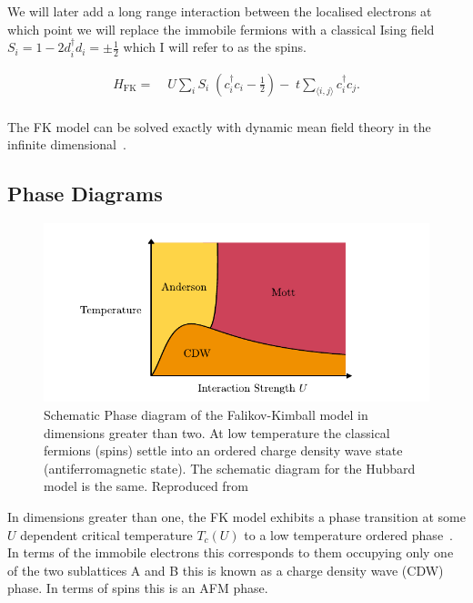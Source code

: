 We will later add a long range interaction between the localised electrons at which point we will replace the immobile fermions with a classical Ising field \(S_i = 1 - 2d^\dagger_id_i = \pm\tfrac{1}{2}\) which I will refer to as the spins.

\[\begin{aligned}
H_{\mathrm{FK}} = & \;U \sum_{i} S_i\;(c^\dagger_{i}c_{i} - \tfrac{1}{2}) -\;t \sum_{\langle i,j\rangle} c^\dagger_{i}c_{j}.\\ 
\end{aligned}\]

The FK model can be solved exactly with dynamic mean field theory in the infinite dimensional~\autocite{antipovCriticalExponentsStrongly2014,ribicNonlocalCorrelationsSpectral2016,freericksExactDynamicalMeanfield2003,herrmannNonequilibriumDynamicalCluster2016}.

\hypertarget{phase-diagrams}{%
\subsection{Phase Diagrams}\label{phase-diagrams}}

\hypertarget{fig:fk_phase_diagram}{%
\begin{figure}
\centering
\includegraphics[width=1\textwidth,height=\textheight]{figure_code/background_chapter/fk_phase_diagram}
\caption[{Falikov-Kimball Temperatue-Interaction Phase Diagrams}]{Schematic Phase diagram of the Falikov-Kimball model in dimensions greater than two. At low temperature the classical fermions (spins) settle into an ordered charge density wave state (antiferromagnetic state). The schematic diagram for the Hubbard model is the same. Reproduced from~\autocite{antipovInteractionTunedAndersonMott2016,antipovCriticalExponentsStrongly2014}}
\label{fig:fk_phase_diagram}
\end{figure}
}

In dimensions greater than one, the FK model exhibits a phase transition at some \(U\) dependent critical temperature \(T_c(U)\) to a low temperature ordered phase~\autocite{maskaThermodynamicsTwodimensionalFalicovKimball2006}. In terms of the immobile electrons this corresponds to them occupying only one of the two sublattices A and B this is known as a charge density wave (CDW) phase. In terms of spins this is an AFM phase.

